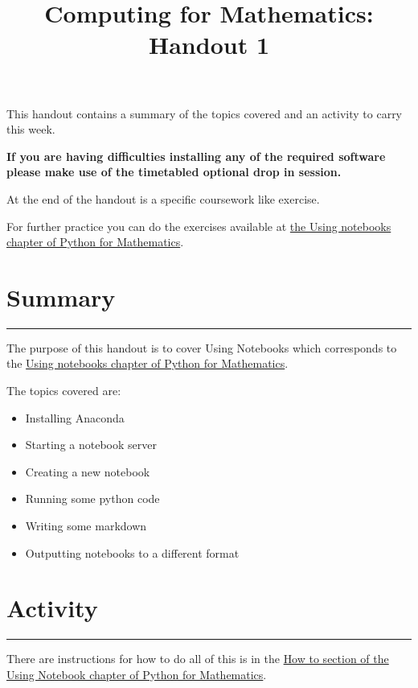 \documentclass{article}
\title{Computing for Mathematics: Handout 1}
\date{}
\begin{document}
\maketitle


This handout contains a summary of the topics covered and an activity to
carry this week.

\textbf{If you are having difficulties installing any of the required software
please make use of the timetabled optional drop in session.}

At the end of the handout is a specific coursework like exercise.

For further practice you can do the exercises available at 
\href{https://vknight.org/pfm/tools-for-mathematics/01-using-notebooks/exercises/main.html}{the Using
notebooks chapter of Python for Mathematics}.

\section{Summary}\label{summary}
\hrule


The purpose of this handout is to cover Using Notebooks which
corresponds to the
\href{https://vknight.org/pfm/tools-for-mathematics/01-using-notebooks/introduction/main.html}{Using
notebooks chapter of Python for Mathematics}.

The topics covered are:

\begin{itemize}
\item
  Installing Anaconda
\item
  Starting a notebook server
\item
  Creating a new notebook
\item
  Running some python code
\item
  Writing some markdown
\item
  Outputting notebooks to a different format
\end{itemize}


\section{Activity}\label{activity}
\hrule

There are instructions for how to do all of this is in the
\href{https://vknight.org/pfm/tools-for-mathematics/01-using-notebooks/how/main.html}{How
to section of the Using Notebook chapter of Python for Mathematics}.
\end{document}
